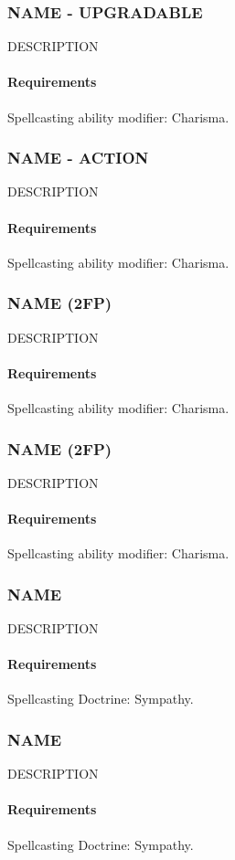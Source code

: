 \subsubsection{NAME - UPGRADABLE} \label{feat::name}
    DESCRIPTION
    \paragraph{Requirements} Spellcasting ability modifier: Charisma.
\subsubsection{NAME - ACTION} \label{feat::name}
    DESCRIPTION
    \paragraph{Requirements} Spellcasting ability modifier: Charisma.
\subsubsection{NAME (2FP)} \label{feat::name}
    DESCRIPTION
    \paragraph{Requirements} Spellcasting ability modifier: Charisma.
\subsubsection{NAME (2FP)} \label{feat::name}
    DESCRIPTION
    \paragraph{Requirements} Spellcasting ability modifier: Charisma.

\subsubsection{NAME} \label{feat::name}
    DESCRIPTION
    \paragraph{Requirements} Spellcasting Doctrine: Sympathy.
\subsubsection{NAME} \label{feat::name}
    DESCRIPTION
    \paragraph{Requirements} Spellcasting Doctrine: Sympathy.
